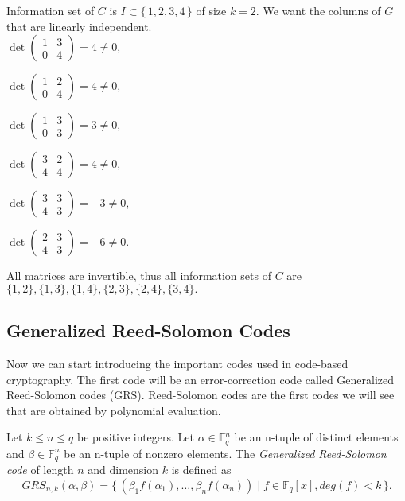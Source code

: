 \begin{solution}
    Information set of $C$ is $I \subset \{\,1,2,3,4\,\}$ of size $k=2$. We want the columns of $G$ that are linearly independent.\\

    $\det\begin{pmatrix}
        1&3\\0&4
    \end{pmatrix}=4\neq0$, 

    $\det\begin{pmatrix}
        1&2\\0&4
    \end{pmatrix}=4\neq0$, 

    $\det\begin{pmatrix}
        1&3\\0&3
    \end{pmatrix}=3\neq0$, 

    $\det\begin{pmatrix}
        3&2\\4&4
    \end{pmatrix}=4\neq0$, 

    $\det\begin{pmatrix}
        3&3\\4&3
    \end{pmatrix}=-3\neq0$, 

    $\det\begin{pmatrix}
        2&3\\4&3
    \end{pmatrix}=-6\neq0$.
    
All matrices are invertible, thus all information sets of $C$ are $\{1,2\},\{1,3\},\{1,4\},\{2,3\},\{2,4\},\{3,4\}.$
\end{solution}

\subsection{Generalized Reed-Solomon Codes}
Now we can start introducing the important codes used in code-based cryptography. The first code will be an error-correction code called Generalized Reed-Solomon codes (GRS). Reed-Solomon codes are the first codes we will see that are obtained by polynomial evaluation.

\begin{definition}
Let $k \leq n \leq q$ be positive integers. Let $\alpha \in \mathbb{F}_q^n$ be an n-tuple of distinct elements and $\beta \in \mathbb{F}_q^n$ be an n-tuple of nonzero elements. The \textit{Generalized Reed-Solomon code} of length $n$ and dimension $k$ is defined as
\[
GRS_{n,k}(\alpha, \beta) = \{\, (\beta_1f(\alpha_1), \dots, \beta_nf(\alpha_n)) \mid f \in \mathbb{F}_q[x], deg(f) < k \,\}.
\]
\end{definition}

